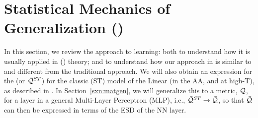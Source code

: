 \section{Statistical Mechanics of Generalization (\SMOG)}
\label{sxn:SMOG_main}

In this section, we review the \STATMECH approach to learning: 
both to understand how it is usually applied in \StatisticalMechanicsOfGeneralization (\SMOG) theory; 
and to understand how our \SemiEmpirical approach in \SETOL is similar to and different from the traditional approach.
We will also obtain an expression for the \GeneralizationAccuracy (or \ModelQuality $\bar{\mathcal{Q}}^{ST}$) for the
classic \StudentTeacher (ST) model of the Linear \Perceptron (in the AA, and at high-T),
as described in \cite{SST90,SST92}.
In Section~\ref{sxn:matgen}, we will generalize this to a \LayerQuality metric, $\bar{\mathcal{Q}}$, for a layer in a general Multi-Layer Perceptron (MLP),
i.e., $\bar{\mathcal{Q}}^{ST}\rightarrow\bar{\mathcal{Q}}$, so that $\bar{\mathcal{Q}}$ can then be expressed in terms of the ESD of the NN layer.

